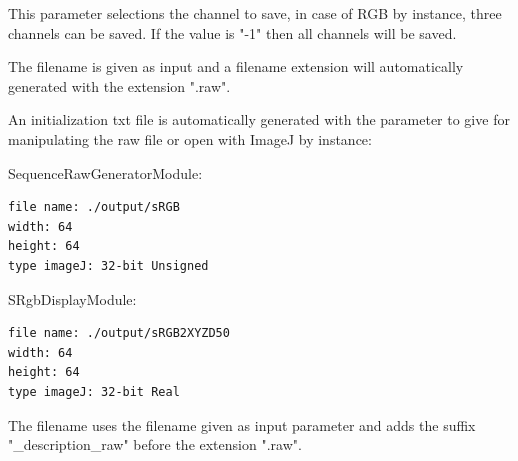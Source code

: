 This parameter selections the channel to save, in case of RGB by instance, three channels can be saved. If the value is "-1" then all channels will be saved.

The filename is given as input and a filename extension will automatically generated with the extension ".raw".

An initialization txt file is automatically generated with the parameter to give for manipulating the raw file or open with ImageJ by instance:

SequenceRawGeneratorModule:

\lstset{language=Scilab}
\begin{lstlisting}
file name: ./output/sRGB
width: 64
height: 64
type imageJ: 32-bit Unsigned
\end{lstlisting}

SRgbDisplayModule:

\lstset{language=Scilab}
\begin{lstlisting}
file name: ./output/sRGB2XYZD50
width: 64
height: 64
type imageJ: 32-bit Real
\end{lstlisting}

The filename uses the filename given as input parameter and adds the suffix "\_description\_raw" before the extension ".raw".




